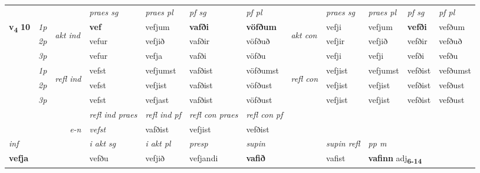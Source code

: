 \begin{longtable}[l]{X>{\footnotesize\itshape}llXXXXlXXXX}
 & &   & \textit{praes sg}  & \textit{praes pl}    & \textit{ pf sg} & \textit{pf pl} & & \textit{praes sg}  & \textit{praes pl}    & \textit{pf sg} & \textit{pf pl }  \\ \cmidrule{4-7} \cmidrule{9-12}
 \multirow{2}{*}{{{\textbf{v{\textsubscript{4}}} \Large{\textbf{10}}}}}  & 1p & \multirow{3}{*}{\begin{turn}{90}\textit{akt ind}\end{turn}} & \textbf{vef} & vefjum & \textbf{vafði} & \textbf{vöfðum} & \multirow{3}{*}{\begin{turn}{90}\textit{akt con}\end{turn}} &vefji & vefjum & \textbf{vefði} & vefðum\\*
 & 2p &  &  vefur  & vefjið & vafðir & vöfðuð & & vefjir & vefjið & vefðir & vefðuð \\*
 & 3p &  & vefur & vefja & vafði & vöfðu & & vefji & vefji& vefði & vefðu \\*
\cmidrule{4-7} \cmidrule{9-12}
 & 1p & \multirow{3}{*}{\begin{turn}{90}\textit{refl ind}\end{turn}}  & vefst & vefjumst & vafðist & vöfðumst & \multirow{3}{*}{\begin{turn}{90}\textit{refl con}\end{turn}}  &vefjist & vefjumst & vefðist & vefðumst \\*
 & 2p &  & vefst & vefjist & vafðist & vöfðust & &vefjist & vefjist & vefðist & vefðust \\*
 & 3p  & & vefst & vefjast & vafðist & vöfðust & & vefjist & vefjist& vefðist & vefðust \\*
\cmidrule{4-7} \cmidrule{9-12}

 & && \textit{refl ind praes} & \textit{refl ind pf} & \textit{refl con praes} & \textit{refl con pf} \\*
\multicolumn{3}{r}{\textit{e-n}}& vefst & vafðist & vefjist & vefðist \\*

\cmidrule{4-7}
   {\textit{inf}} & &  & \textit{i akt sg} & \textit{i akt pl}   & \textit{presp} & \textit{supin} && \textit{supin refl} & \textit{pp m} \\*
  {\textbf{vefja}} & && vefðu  & vefjið   & vefjandi &  \textbf{vafið} && vafist & \multicolumn{2}{l}{\textbf{vafinn} adj\textbf{\textsubscript{6-14}}} \\*

\midrule


\end{longtable}
